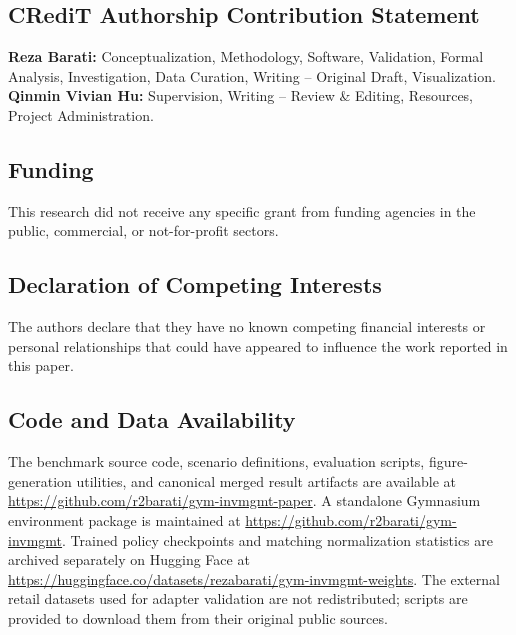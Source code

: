 \documentclass[10pt,a4paper]{article}
\begin{document}
\subsection*{CRediT Authorship Contribution Statement}

\textbf{Reza Barati:} Conceptualization, Methodology, Software,
Validation, Formal Analysis, Investigation, Data Curation, Writing
-- Original Draft, Visualization.
\textbf{Qinmin Vivian Hu:} Supervision, Writing -- Review \& Editing,
Resources, Project Administration.

\subsection*{Funding}

This research did not receive any specific grant from funding agencies
in the public, commercial, or not-for-profit sectors.

\subsection*{Declaration of Competing Interests}

The authors declare that they have no known competing financial
interests or personal relationships that could have appeared to
influence the work reported in this paper.

\subsection*{Code and Data Availability}

The benchmark source code, scenario definitions, evaluation scripts,
figure-generation utilities, and canonical merged result artifacts are
available at \url{https://github.com/r2barati/gym-invmgmt-paper}.
A standalone Gymnasium environment package is maintained at
\url{https://github.com/r2barati/gym-invmgmt}. Trained policy checkpoints
and matching normalization statistics are archived separately on Hugging
Face at \url{https://huggingface.co/datasets/rezabarati/gym-invmgmt-weights}.
The external retail datasets used for adapter validation are not
redistributed; scripts are provided to download them from their original
public sources.



\end{document}
